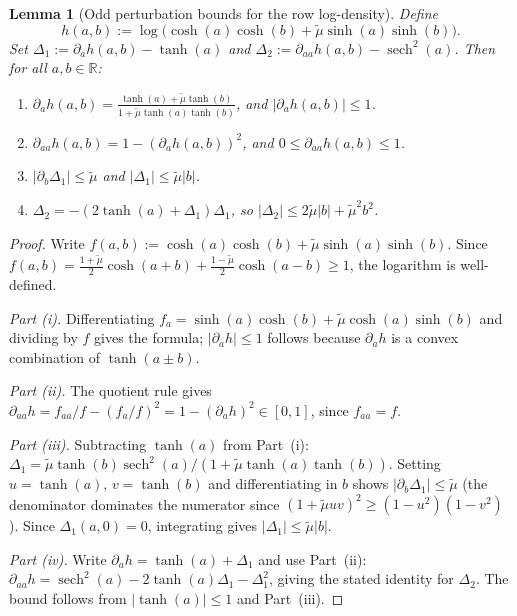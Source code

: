 \documentclass[10pt]{article}
\newtheorem{lemma}{Lemma}
\newcommand{\R}{\mathbb R}
\begin{document}
\begin{lemma}[Odd perturbation bounds for the row log-density]
\label{lem:sec3_product_odd_pert}
Define
\[
    h(a,b):=\log\!\bigl(\cosh(a)\cosh(b)+\tilde\mu\sinh(a)\sinh(b)\bigr).
\]
Set $\Delta_1:=\partial_a h(a,b)-\tanh(a)$ and
$\Delta_2:=\partial_{aa}h(a,b)-\operatorname{sech}^2(a)$.  Then for all
$a,b\in\R$:
\begin{enumerate}[label=(\roman*)]
\item $\displaystyle\partial_a h(a,b)
      =
      \frac{\tanh(a)+\tilde\mu\tanh(b)}{1+\tilde\mu\tanh(a)\tanh(b)}$,
      and $|\partial_a h(a,b)|\le 1$.
\item $\partial_{aa}h(a,b)=1-(\partial_a h(a,b))^2$,
      and $0\le\partial_{aa}h(a,b)\le 1$.
\item $|\partial_b\Delta_1|\le\tilde\mu$ and $|\Delta_1|\le\tilde\mu|b|$.
\item $\Delta_2=-(2\tanh(a)+\Delta_1)\Delta_1$,
      so $|\Delta_2|\le 2\tilde\mu|b|+\tilde\mu^2 b^2$.
\end{enumerate}
\end{lemma}

\begin{proof}
Write $f(a,b):=\cosh(a)\cosh(b)+\tilde\mu\sinh(a)\sinh(b)$.  Since
$f(a,b)=\frac{1+\tilde\mu}{2}\cosh(a+b)+\frac{1-\tilde\mu}{2}\cosh(a-b)\ge1$,
the logarithm is well-defined.

\textit{Part (i).}  Differentiating $f_a=\sinh(a)\cosh(b)+\tilde\mu\cosh(a)\sinh(b)$
and dividing by $f$ gives the formula; $|\partial_a h|\le1$ follows because
$\partial_a h$ is a convex combination of $\tanh(a\pm b)$.

\textit{Part (ii).}  The quotient rule gives
$\partial_{aa}h=f_{aa}/f-(f_a/f)^2=1-(\partial_a h)^2\in[0,1]$,
since $f_{aa}=f$.

\textit{Part (iii).}  Subtracting $\tanh(a)$ from Part~(i):
$\Delta_1=\tilde\mu\tanh(b)\operatorname{sech}^2(a)/(1+\tilde\mu\tanh(a)\tanh(b))$.
Setting $u=\tanh(a)$, $v=\tanh(b)$ and differentiating in $b$ shows
$|\partial_b\Delta_1|\le\tilde\mu$ (the denominator dominates the numerator
since $(1+\tilde\mu uv)^2\ge(1-u^2)(1-v^2)$).  Since $\Delta_1(a,0)=0$,
integrating gives $|\Delta_1|\le\tilde\mu|b|$.

\textit{Part (iv).}  Write $\partial_a h=\tanh(a)+\Delta_1$ and use Part~(ii):
$\partial_{aa}h=\operatorname{sech}^2(a)-2\tanh(a)\Delta_1-\Delta_1^2$,
giving the stated identity for $\Delta_2$.  The bound follows from
$|\tanh(a)|\le1$ and Part~(iii).
\end{proof}
\end{document}
